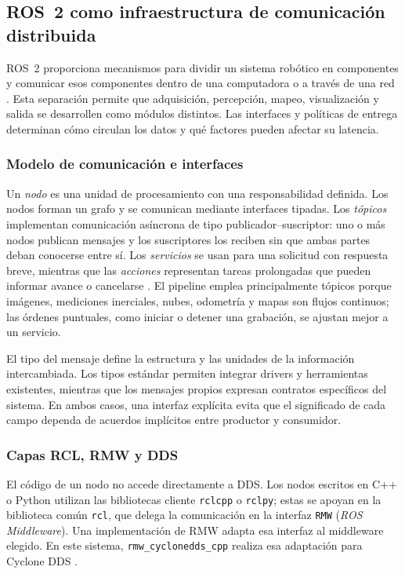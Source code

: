 \subsection{ROS~2 como infraestructura de comunicación distribuida}
\label{sec:mt-ros2}

ROS~2 proporciona mecanismos para dividir un sistema robótico en componentes y comunicar esos
componentes dentro de una computadora o a través de una red \cite{ROS}. Esta separación permite
que adquisición, percepción, mapeo, visualización y salida se desarrollen como módulos distintos.
Las interfaces y políticas de entrega determinan cómo circulan los datos y qué factores pueden
afectar su latencia.

\subsubsection{Modelo de comunicación e interfaces}

Un \emph{nodo} es una unidad de procesamiento con una responsabilidad definida. Los nodos forman
un grafo y se comunican mediante interfaces tipadas. Los \emph{tópicos} implementan comunicación
asíncrona de tipo publicador--suscriptor: uno o más nodos publican mensajes y los suscriptores los
reciben sin que ambas partes deban conocerse entre sí. Los \emph{servicios} se usan para una
solicitud con respuesta breve, mientras que las \emph{acciones} representan tareas prolongadas
que pueden informar avance o cancelarse \cite{ROS2Interfaces}. El pipeline emplea principalmente
tópicos porque imágenes, mediciones inerciales, nubes, odometría y mapas son flujos continuos; las
órdenes puntuales, como iniciar o detener una grabación, se ajustan mejor a un servicio.

El tipo del mensaje define la estructura y las unidades de la información intercambiada. Los tipos
estándar permiten integrar drivers y herramientas existentes, mientras que los mensajes propios
expresan contratos específicos del sistema. En ambos casos, una interfaz explícita evita que el
significado de cada campo dependa de acuerdos implícitos entre productor y consumidor.

\subsubsection{Capas RCL, RMW y DDS}

El código de un nodo no accede directamente a DDS. Los nodos escritos en C++ o Python utilizan las
bibliotecas cliente \texttt{rclcpp} o \texttt{rclpy}; estas se apoyan en la biblioteca común
\texttt{rcl}, que delega la comunicación en la interfaz \texttt{RMW} (\emph{ROS Middleware}). Una
implementación de RMW adapta esa interfaz al middleware elegido. En este sistema,
\texttt{rmw\_cyclonedds\_cpp} realiza esa adaptación para Cyclone DDS \cite{ROS2RMW}.

